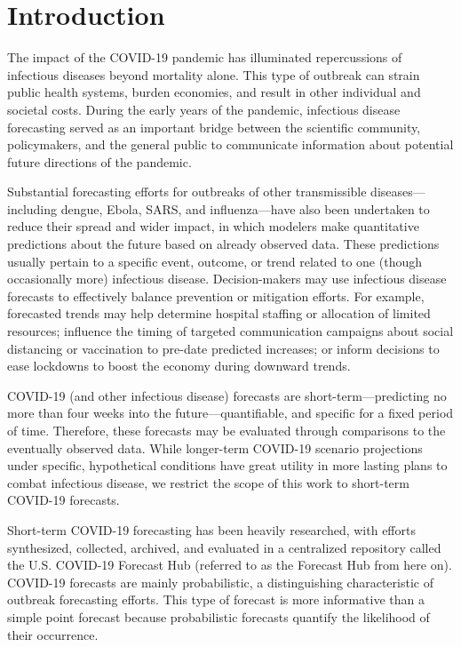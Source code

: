 \documentclass[thesis]{umassthesis}  %
\begin{document}


\mainmatter   %

\chapter{Introduction} \label{Introduction}
The impact of the COVID-19 pandemic has illuminated repercussions of infectious diseases beyond mortality alone. This type of outbreak can strain public health systems, burden economies, and result in other individual and societal costs. During the early years of the pandemic, infectious disease forecasting served as an important bridge between the scientific community, policymakers, and the general public to communicate information about potential future directions of the pandemic.

Substantial forecasting efforts for outbreaks of other transmissible diseases---\newline including dengue, Ebola, SARS, and influenza---have also been undertaken to reduce their spread and wider impact\cite{lauer}, in which modelers make quantitative predictions about the future based on already observed data. These predictions usually pertain to a specific event, outcome, or trend related to one (though occasionally more) infectious disease\cite{lauer}. Decision-makers may use infectious disease forecasts to effectively balance prevention or mitigation efforts\cite{disease_economics}. For example, forecasted trends may help determine hospital staffing or allocation of limited resources; influence the timing of targeted communication campaigns about social distancing or vaccination to pre-date predicted increases; or inform decisions to ease lockdowns to boost the economy during downward trends.

COVID-19 (and other infectious disease) forecasts are short-term---predicting no more than four weeks into the future---quantifiable, and specific for a fixed period of time. Therefore, these forecasts may be evaluated through comparisons to the eventually observed data\cite{cramer, lauer}. While longer-term COVID-19 scenario projections under specific, hypothetical conditions have great utility in more lasting plans to combat infectious disease, we restrict the scope of this work to short-term COVID-19 forecasts.

Short-term COVID-19 forecasting has been heavily researched, with efforts synthesized, collected, archived, and evaluated in a centralized repository called the U.S. COVID-19 Forecast Hub\cite{hub_data_repo} (referred to as the Forecast Hub from here on). COVID-19 forecasts are mainly probabilistic, a distinguishing characteristic of outbreak forecasting efforts. This type of forecast is more informative than a simple point forecast because probabilistic forecasts quantify the likelihood of their occurrence\cite{cramer, hub_data_repo, lauer}.
\end{document}
